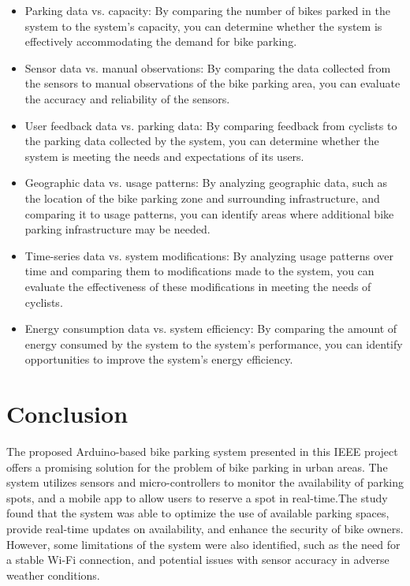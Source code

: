 \documentclass[conference]{IEEEtran}
\begin{document}
	 	\begin{itemize}
	 	\item Parking data vs. capacity: 
	 	By comparing the number of bikes parked in the system to the system's capacity, you can determine whether the system is effectively accommodating the demand for bike parking.
	 	\item Sensor data vs. manual observations: 
	 	By comparing the data collected from the sensors to manual observations of the bike parking area, you can evaluate the accuracy and reliability of the sensors.
	 	\item User feedback data vs. parking data: 
	 	By comparing feedback from cyclists to the parking data collected by the system, you can determine whether the system is meeting the needs and expectations of its users.
	 	\item Geographic data vs. usage patterns: 
	 	By analyzing geographic data, such as the location of the bike parking zone and surrounding infrastructure, and comparing it to usage patterns, you can identify areas where additional bike parking infrastructure may be needed.\cite{b6}
	 	\item Time-series data vs. system modifications: 
	 	By analyzing usage patterns over time and comparing them to modifications made to the system, you can evaluate the effectiveness of these modifications in meeting the needs of cyclists. 	
	 	\item Energy consumption data vs. system efficiency:
	 	By comparing the amount of energy consumed by the system to the system's performance, you can identify opportunities to improve the system's energy efficiency.
	 \end{itemize}
	 
\section{Conclusion}
	The proposed Arduino-based bike parking system presented in this IEEE project offers a promising solution for the problem of bike parking in urban areas. The system utilizes sensors and micro-controllers to monitor the availability of parking spots, and a mobile app to allow users to reserve a spot in real-time.The study found that the system was able to optimize the use of available parking spaces, provide real-time updates on availability, and enhance the security of bike owners. However, some limitations of the system were also identified, such as the need for a stable Wi-Fi connection, and potential issues with sensor accuracy in adverse weather conditions.
		
\end{document}
